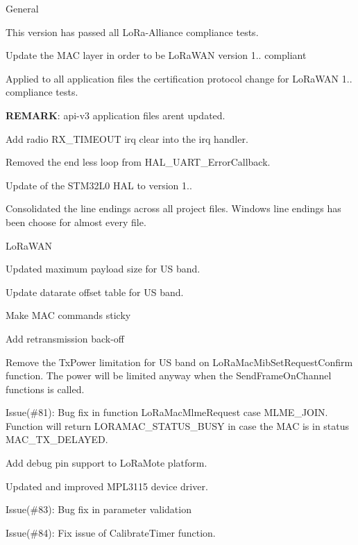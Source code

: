 \begin{DoxyItemize}
\item General
\begin{DoxyEnumerate}
\item This version has passed all Lo\+Ra-\/\+Alliance compliance tests.
\item Update the M\+AC layer in order to be Lo\+Ra\+W\+AN version 1.. compliant
\item Applied to all application files the certification protocol change for Lo\+Ra\+W\+AN 1.. compliance tests.

{\bfseries R\+E\+M\+A\+RK}\+: api-\/v3 application files aren\textquotesingle{}t updated.
\item Add radio R\+X\+\_\+\+T\+I\+M\+E\+O\+UT irq clear into the irq handler.
\item Removed the end less loop from H\+A\+L\+\_\+\+U\+A\+R\+T\+\_\+\+Error\+Callback.
\item Update of the S\+T\+M32\+L0 H\+AL to version 1..
\item Consolidated the line endings across all project files. Windows line endings has been choose for almost every file.
\end{DoxyEnumerate}
\item Lo\+Ra\+W\+AN
\begin{DoxyEnumerate}
\item Updated maximum payload size for US band.
\item Update datarate offset table for US band.
\item Make M\+AC commands sticky
\item Add retransmission back-\/off
\item Remove the Tx\+Power limitation for US band on Lo\+Ra\+Mac\+Mib\+Set\+Request\+Confirm function. The power will be limited anyway when the Send\+Frame\+On\+Channel functions is called.
\item Issue(\#81)\+: Bug fix in function Lo\+Ra\+Mac\+Mlme\+Request case M\+L\+M\+E\+\_\+\+J\+O\+IN. Function will return L\+O\+R\+A\+M\+A\+C\+\_\+\+S\+T\+A\+T\+U\+S\+\_\+\+B\+U\+SY in case the M\+AC is in status M\+A\+C\+\_\+\+T\+X\+\_\+\+D\+E\+L\+A\+Y\+ED.
\item Add debug pin support to Lo\+Ra\+Mote platform.
\item Updated and improved M\+P\+L3115 device driver.
\item Issue(\#83)\+: Bug fix in parameter validation
\item Issue(\#84)\+: Fix issue of Calibrate\+Timer function.

\end{DoxyEnumerate}
\end{DoxyItemize}
